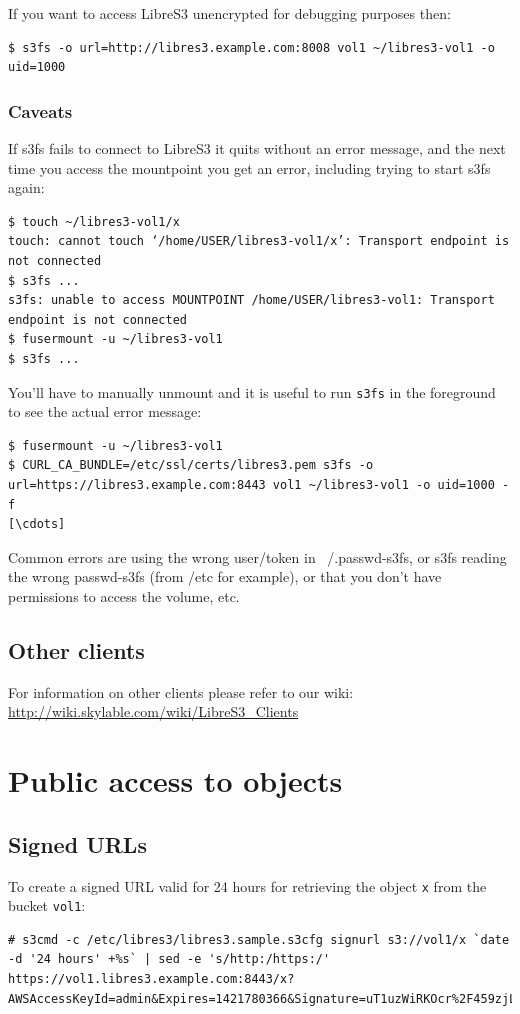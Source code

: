 If you want to access LibreS3 unencrypted for debugging purposes then:
\begin{lstlisting}
$ s3fs -o url=http://libres3.example.com:8008 vol1 ~/libres3-vol1 -o uid=1000
\end{lstlisting}

\subsection*{Caveats}

If s3fs fails to connect to LibreS3 it quits without an error message,
and the next time you access the mountpoint you get an error,
including trying to start s3fs again:
\begin{lstlisting}
$ touch ~/libres3-vol1/x
touch: cannot touch ‘/home/USER/libres3-vol1/x’: Transport endpoint is not connected
$ s3fs ...
s3fs: unable to access MOUNTPOINT /home/USER/libres3-vol1: Transport endpoint is not connected
$ fusermount -u ~/libres3-vol1
$ s3fs ...
\end{lstlisting}

You'll have to manually unmount and it is useful to run \verb|s3fs| in the
foreground to see the actual error message:
\begin{lstlisting}
$ fusermount -u ~/libres3-vol1
$ CURL_CA_BUNDLE=/etc/ssl/certs/libres3.pem s3fs -o url=https://libres3.example.com:8443 vol1 ~/libres3-vol1 -o uid=1000 -f
[\cdots]
\end{lstlisting}

Common errors are using the wrong user/token in ~/.passwd-s3fs, or
s3fs reading the wrong passwd-s3fs (from /etc for example), or that you don't have permissions to access the volume, etc.

\section*{Other clients}
For information on other clients please refer to our wiki:
\url{http://wiki.skylable.com/wiki/LibreS3_Clients}

\chapter*{Public access to objects}
\section*{Signed URLs}

To create a signed URL valid for 24 hours for retrieving the object \verb|x| from the bucket \verb|vol1|:
\begin{lstlisting}
# s3cmd -c /etc/libres3/libres3.sample.s3cfg signurl s3://vol1/x `date -d '24 hours' +%s` | sed -e 's/http:/https:/'
https://vol1.libres3.example.com:8443/x?AWSAccessKeyId=admin&Expires=1421780366&Signature=uT1uzWiRKOcr%2F459zjLvmWoMTSg%3D
\end{lstlisting}

